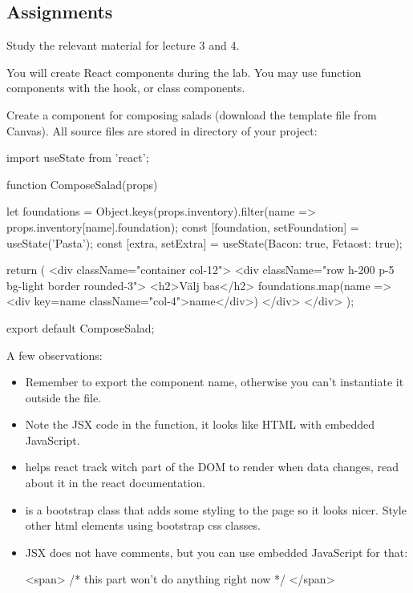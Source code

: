 \documentclass[fleqn, article, a4paper]{memoir}
\begin{document}
\subsection*{Assignments}

\begin{Assignments}

\item Study the relevant material for lecture 3 and 4.

\item You will create React components during the lab. You may use function components with the  hook, or class components.

\item Create a component for composing salads (download the template file from Canvas). All source files are stored in  directory of your project:
\begin{Code}
import { useState } from 'react';

function ComposeSalad(props) {
  let foundations = Object.keys(props.inventory).filter(name => props.inventory[name].foundation);
  const [foundation, setFoundation] = useState('Pasta'); 
  const [extra, setExtra] = useState({Bacon: true, Fetaost: true}); 

  return (
    <div className="container col-12">
      <div className="row h-200 p-5 bg-light border rounded-3">
        <h2>Välj bas</h2>
        {foundations.map(name => <div key={name} className="col-4">{name}</div>)}
      </div>
    </div>
  );
}
export default ComposeSalad;\end{Code}

\noindent A few observations:
\begin{itemize}
  \item Remember to export the component name, otherwise you can't instantiate it outside the file.
  \item Note the JSX code in the function, it looks like HTML with embedded JavaScript.
   \item {} helps react track witch part of the DOM to render when data changes, read about it in the react documentation.
   \item {} is a bootstrap class that adds some styling to the page so it looks nicer. Style other html elements using bootstrap css classes.
   \item JSX does not have comments, but you can use embedded JavaScript for that:
\begin{Code}
<span>  {/* this part won't do anything right now */}  </span>
\end{Code}
\end{itemize}


\end{Assignments}
\end{document}
